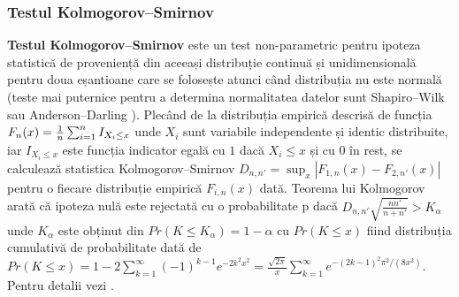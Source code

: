 \documentclass[12pt,draft]{article}
\begin{document}
\subsubsection{Testul Kolmogorov–Smirnov}
 \label{testKS}
 \textbf{Testul Kolmogorov–Smirnov} este un test non-parametric pentru ipoteza statistică de proveniență din aceeași distribuție continuă și unidimensională pentru doua eșantioane care se folosește atunci când distribuția nu este normală (teste mai puternice pentru a determina normalitatea datelor sunt  Shapiro–Wilk sau Anderson–Darling \citep{Stephens74} ). 
 Plecând de la distribuția empirică descrisă de funcția $F_n(x)={1 \over n}\sum_{i=1}^n I_{X_i\leq x}$ unde $X_i$ sunt variabile independente și identic distribuite, iar $I_{X_i\leq x}$ este funcția indicator egală cu $1$ dacă $X_i\leq x$ și cu $0$ în rest, se calculează statistica Kolmogorov–Smirnov $D_{n,n'}=\sup_x |F_{1,n}(x)-F_{2,n'}(x)|$ pentru o fiecare distribuție empirică $F_{i,n}(x)$ dată. 
 Teorema lui Kolmogorov arată că ipoteza nulă este rejectată cu o probabilitate p dacă $D_{n,n'}\sqrt{\frac{n n'}{n + n'}}>K_\alpha$ unde $K_\alpha$ este obținut din $Pr(K\leq K_\alpha)=1-\alpha$ cu $Pr(K\leq x)$ fiind distribuția cumulativă de probabilitate dată de $Pr(K\leq x)=1-2\sum_{k=1}^\infty (-1)^{k-1} e^{-2k^2 x^2}=\frac{\sqrt{2\pi}}{x}\sum_{k=1}^\infty e^{-(2k-1)^2\pi^2/(8x^2)}$. 
 Pentru detalii vezi \citep{stuart99}.
\end{document}
